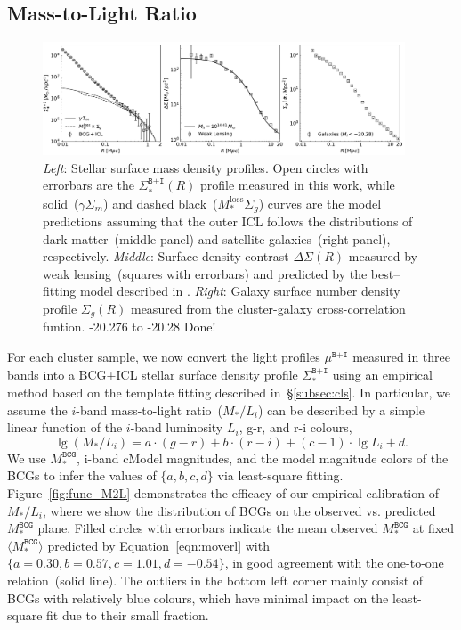 \documentclass[fleqn,usenatbib]{mnras}
\newcommand{\sigbi}{\Sigma_*^{\texttt{B+I}}}
\newcommand{\sigm}{\Sigma_m}
\newcommand{\sigg}{\Sigma_g}
\newcommand{\mubi}{\mu^{\texttt{B+I}}}
\newcommand{\msbcg}{M_*^{\texttt{BCG}}}
\newcommand{\ds}{\Delta\Sigma}
\newcommand\ying[1]{{\color{red} {#1}}}
\newcommand\xkchen[1]{{\color{cyan} {#1}}}
\begin{document}
\subsection{Mass-to-Light Ratio}
\label{subsec:moverl}

\begin{figure}
    \centering\includegraphics[width=0.96\textwidth]{fig/total_sample_SB_SM.pdf}
    \caption{{\it Left}: Stellar surface mass density profiles. Open
    circles with errorbars are the $\sigbi(R)$ profile measured in this
    work, while solid~($\gamma\sigm$) and dashed
    black~($M_*^{\mathrm{loss}}\sigg$) curves are the model predictions
    assuming that the outer ICL follows the distributions of dark
    matter~(middle panel) and satellite galaxies~(right panel),
    respectively.  {\it Middle}: Surface density contrast $\ds(R)$ measured
    by weak lensing~(squares with errorbars) and predicted by the
    best--fitting model described in . {\it Right}:
    Galaxy surface number density profile $\sigg(R)$ measured from the
    cluster-galaxy cross-correlation funtion.\ying{-20.276 to -20.28} \xkchen{Done!}
    \label{fig:massprof3panel} }
\end{figure}

For each cluster sample, we now convert the light profiles $\mubi$ measured
in three bands into a BCG+ICL stellar surface density profile $\sigbi$
using an empirical method based on the template fitting described
in~\S\ref{subsec:cls}.  In particular, we assume the $i$-band mass-to-light
ratio~($M_*/L_i$) can be described by a simple linear function of the
$i$-band luminosity $L_i$, g-r, and r-i colours,
\begin{equation}
    \lg(M_{\ast}/L_{i}) = a \cdot (g-r) + b \cdot (r-i) + (c - 1) \cdot \lg L_{i} + d.
    \label{eqn:moverl}
\end{equation}
We use $\msbcg$, i-band cModel magnitudes, and the model magnitude colors
of the BCGs to infer the values of $\{a, b, c, d\}$ via least-square
fitting. Figure~\ref{fig:func_M2L} demonstrates the efficacy of our
empirical calibration of $M_*/L_i$, where we show the distribution of BCGs
on the observed vs. predicted $\msbcg$ plane. Filled circles with errorbars
indicate the mean observed $\msbcg$ at fixed $\langle\msbcg\rangle$
predicted by Equation~\ref{eqn:moverl} with $\{a{=}0.30, b{=}0.57,
c{=}1.01, d{=}{-}0.54\}$, in good agreement with the one-to-one
relation~(solid line). The outliers in the bottom left corner mainly
consist of BCGs with relatively blue colours, which have minimal impact on
the least-square fit due to their small fraction.
\end{document}
